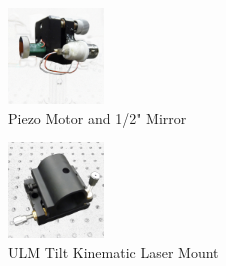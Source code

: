\begin{figure}[ht]
\centering
\includegraphics[width=1in]{PiezoandMirror}
\caption{Piezo Motor and 1/2" Mirror}
\label{fig:piezo}
\end{figure}

\begin{figure}[ht]
\centering
\includegraphics[width=1in]{ULMTiltKinematicLaserMount}
\caption{ULM Tilt Kinematic Laser Mount}
\label{fig:lasermount}
\end{figure}
